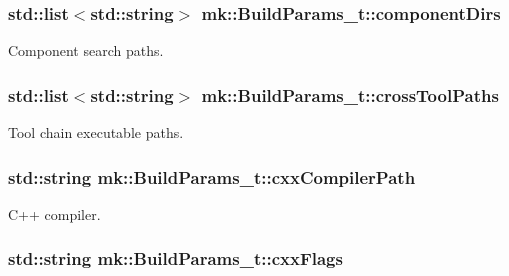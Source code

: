 \subsubsection[{\texorpdfstring{component\+Dirs}{componentDirs}}]{\setlength{\rightskip}{0pt plus 5cm}std\+::list$<$std\+::string$>$ mk\+::\+Build\+Params\+\_\+t\+::component\+Dirs}\hypertarget{structmk_1_1_build_params__t_a9f73582ec04a0c7122c62139d270f857}{}\label{structmk_1_1_build_params__t_a9f73582ec04a0c7122c62139d270f857}


Component search paths. 

\subsubsection[{\texorpdfstring{cross\+Tool\+Paths}{crossToolPaths}}]{\setlength{\rightskip}{0pt plus 5cm}std\+::list$<$std\+::string$>$ mk\+::\+Build\+Params\+\_\+t\+::cross\+Tool\+Paths}\hypertarget{structmk_1_1_build_params__t_ae2ba9ff9589edc20cfe083911a186a6c}{}\label{structmk_1_1_build_params__t_ae2ba9ff9589edc20cfe083911a186a6c}


Tool chain executable paths. 

\subsubsection[{\texorpdfstring{cxx\+Compiler\+Path}{cxxCompilerPath}}]{\setlength{\rightskip}{0pt plus 5cm}std\+::string mk\+::\+Build\+Params\+\_\+t\+::cxx\+Compiler\+Path}\hypertarget{structmk_1_1_build_params__t_ade3d92fa9276c4ac12fb1a5709e2982a}{}\label{structmk_1_1_build_params__t_ade3d92fa9276c4ac12fb1a5709e2982a}


C++ compiler. 

\subsubsection[{\texorpdfstring{cxx\+Flags}{cxxFlags}}]{\setlength{\rightskip}{0pt plus 5cm}std\+::string mk\+::\+Build\+Params\+\_\+t\+::cxx\+Flags}\hypertarget{structmk_1_1_build_params__t_a8dac640bfde50a3cc4b676f440b7c535}{}\label{structmk_1_1_build_params__t_a8dac640bfde50a3cc4b676f440b7c535}


